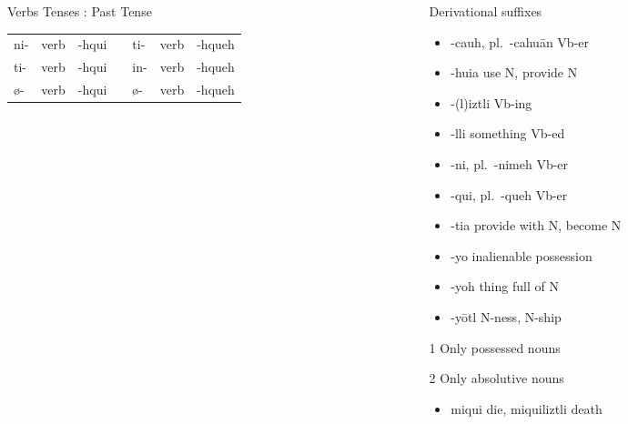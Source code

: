\documentclass[12pt]{beamer}
\newcommand{\nah}[1]{\textcolor{nahgrn}{#1}}
\newcommand{\trs}[1]{\textcolor{nahblu}{#1}}
\begin{document}
\begin{frame}
\begin{columns}[t]
\begin{column}{.26\linewidth}
\begin{block}{Verbs Tenses : Past Tense}
\begin{enumerate}
\begin{tabular}[t]{lllllll}
    				\cline{1-7}
    				\nah{ni-}   & verb & \trs{-hqui}   & \vline & \nah{ti-}   & verb & \trs{-hqueh} \\
    				\nah{ti-}   & verb & \trs{-hqui}   & \vline & \nah{in-}   & verb & \trs{-hqueh} \\
    				\nah{ø-}    & verb & \trs{-hqui}   & \vline & \nah{ø-}    & verb & \trs{-hqueh} \\
    			\end{tabular}
    		\end{enumerate}
    	\end{block}
    \end{column}

    \begin{column}{.20\linewidth}
      \begin{block}{Derivational suffixes}
      	\begin{threeparttable}
      		\begin{itemize}
      			\item \nah{-cauh}, pl.~\nah{-cahuān}  \trs{Vb-er}
      			\item \nah{-huia} \trs{use N, provide N}
      			\item \nah{-(l)iztli} \trs{Vb-ing}
      			\item \nah{-lli} \trs{something Vb-ed}
      			\item \nah{-ni}, pl.~\nah{-nimeh}  \trs{Vb-er}
      			\item \nah{-qui}, pl.~\nah{-queh}  \trs{Vb-er}
      			\item \nah{-tia} \trs{provide with N, become N}
      			\item \nah{-yo} inalienable possession
      			\item \nah{-yoh} \trs{thing full of N}
      			\item \nah{-yōtl} \trs{N-ness, N-ship}
      		\end{itemize}
      		\begin{tablenotes}
      			\item[1] Only possessed nouns
      			\item[2] Only absolutive nouns
      		\end{tablenotes}
      	\end{threeparttable}
      \end{block}
      \begin{example}
      	\begin{itemize}
      		\item \nah{miqui} \trs{die}, \nah{miquiliztli} \trs{death}

\end{itemize}
\end{example}
\end{column}
\end{columns}
\end{frame}
\end{document}
